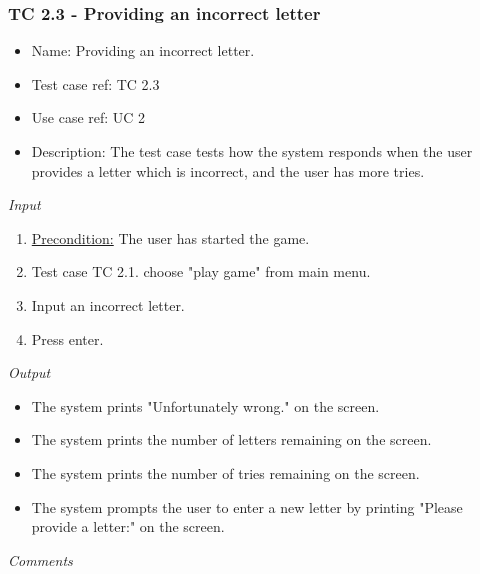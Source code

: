 \documentclass[12pt, letterpaper]{article}
\begin{document}
\subsubsection{TC 2.3 - Providing an incorrect letter}
\begin{itemize}
	\item Name: Providing an incorrect letter.
	\item Test case ref: TC 2.3
	\item Use case ref: UC 2
	\item Description: The test case tests how the system responds when the user provides a letter which is incorrect, and the user has more tries.
\end{itemize}
\emph{Input}
\begin{enumerate}
	\item \underline{Precondition:} The user has started the game.
	\item Test case TC 2.1. choose "play game" from main menu.
	\item Input an incorrect letter.
	\item Press enter.
\end{enumerate}
\emph{Output}
\begin{itemize}
	\item The system prints "Unfortunately wrong." on the screen.
	\item The system prints the number of letters remaining on the screen.
	\item The system prints the number of tries remaining on the screen.
	\item The system prompts the user to enter a new letter by printing "Please provide a letter:" on the screen.
\end{itemize}
\begin{Form}
	\newline
	\newline
\end{Form}
\newline
\emph{Comments}
\newline
\newline
\newline
\newline
\newline
\newline
\newline
\end{document}
